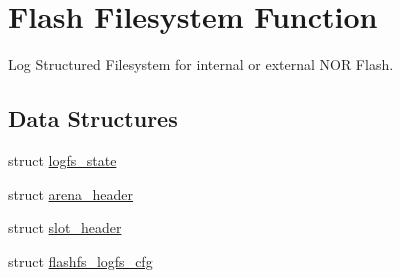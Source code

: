 \hypertarget{group___p_i_o_s___f_l_a_s_h_f_s}{\section{\-Flash \-Filesystem \-Function}
\label{group___p_i_o_s___f_l_a_s_h_f_s}
}


\-Log \-Structured \-Filesystem for internal or external \-N\-O\-R \-Flash.  


\subsection*{\-Data \-Structures}
\begin{DoxyCompactItemize}
\item 
struct \hyperlink{structlogfs__state}{logfs\-\_\-state}
\item 
struct \hyperlink{structarena__header}{arena\-\_\-header}
\item 
struct \hyperlink{structslot__header}{slot\-\_\-header}
\item 
struct \hyperlink{structflashfs__logfs__cfg}{flashfs\-\_\-logfs\-\_\-cfg}
\end{DoxyCompactItemize}
